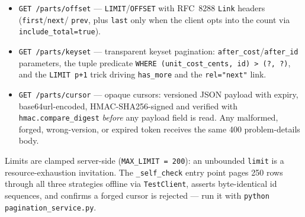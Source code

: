 \begin{itemize}
  \item \texttt{GET /parts/offset} --- \texttt{LIMIT}/\texttt{OFFSET} with
        RFC~8288 \texttt{Link} headers (\texttt{first}/\texttt{next}/
        \texttt{prev}, plus \texttt{last} only when the client opts into the
        count via \texttt{include\_total=true}).
  \item \texttt{GET /parts/keyset} --- transparent keyset pagination:
        \texttt{after\_cost}/\texttt{after\_id} parameters, the tuple
        predicate \texttt{WHERE (unit\_cost\_cents, id) > (?, ?)}, and the
        \texttt{LIMIT p+1} trick driving \texttt{has\_more} and the
        \texttt{rel="next"} link.
  \item \texttt{GET /parts/cursor} --- opaque cursors: versioned JSON
        payload with expiry, base64url-encoded, HMAC-SHA256-signed and
        verified with \texttt{hmac.compare\_digest} \emph{before} any payload
        field is read. Any malformed, forged, wrong-version, or expired
        token receives the same 400 problem-details body.
\end{itemize}

Limits are clamped server-side (\texttt{MAX\_LIMIT = 200}): an unbounded
\texttt{limit} is a resource-exhaustion invitation. The \texttt{\_self\_check}
entry point pages 250 rows through all three strategies offline via
\texttt{TestClient}, asserts byte-identical id sequences, and confirms a
forged cursor is rejected --- run it with
\texttt{python pagination\_service.py}.

